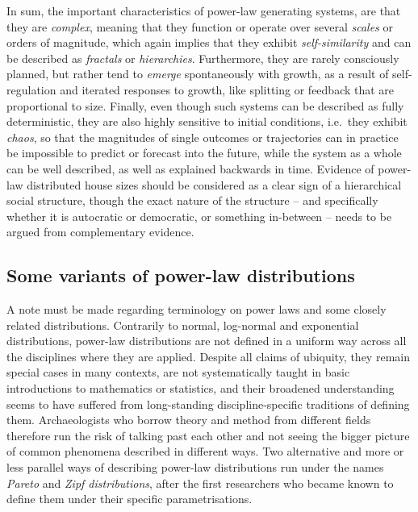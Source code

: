 \documentclass[
  12pt,
]{book}
\begin{document}
In sum, the important characteristics of power-law generating systems, are that they are \emph{complex}, meaning that they function or operate over several \emph{scales} or orders of magnitude, which again implies that they exhibit \emph{self-similarity} and can be described as \emph{fractals} or \emph{hierarchies}. Furthermore, they are rarely consciously planned, but rather tend to \emph{emerge} spontaneously with growth, as a result of self-regulation and iterated responses to growth, like splitting or feedback that are proportional to size. Finally, even though such systems can be described as fully deterministic, they are also highly sensitive to initial conditions, i.e.~they exhibit \emph{chaos}, so that the magnitudes of single outcomes or trajectories can in practice be impossible to predict or forecast into the future, while the system as a whole can be well described, as well as explained backwards in time. Evidence of power-law distributed house sizes should be considered as a clear sign of a hierarchical social structure, though the exact nature of the structure -- and specifically whether it is autocratic or democratic, or something in-between -- needs to be argued from complementary evidence.

\hypertarget{some-variants-of-power-law-distributions}{%
\subsection{Some variants of power-law distributions}\label{some-variants-of-power-law-distributions}}

A note must be made regarding terminology on power laws and some closely related distributions. Contrarily to normal, log-normal and exponential distributions, power-law distributions are not defined in a uniform way across all the disciplines where they are applied. Despite all claims of ubiquity, they remain special cases in many contexts, are not systematically taught in basic introductions to mathematics or statistics, and their broadened understanding seems to have suffered from long-standing discipline-specific traditions of defining them. Archaeologists who borrow theory and method from different fields therefore run the risk of talking past each other and not seeing the bigger picture of common phenomena described in different ways. Two alternative and more or less parallel ways of describing power-law distributions run under the names \emph{Pareto} and \emph{Zipf distributions}, after the first researchers who became known to define them under their specific parametrisations.
\end{document}
